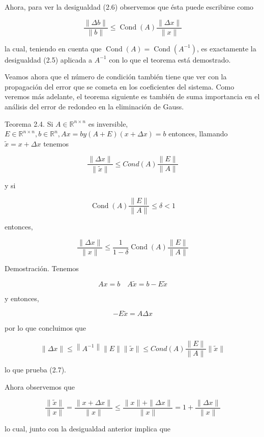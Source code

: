 \documentclass[10pt]{book}
\begin{document}
Ahora, para ver la desigualdad (2.6) observemos que ésta puede escribirse como

$$
\frac{\|\Delta b\|}{\|b\|} \leq \operatorname{Cond}(A) \frac{\|\Delta x\|}{\|x\|}
$$

la cual, teniendo en cuenta que $\operatorname{Cond}(A)=\operatorname{Cond}\left(A^{-1}\right)$, es exactamente la desigualdad (2.5) aplicada a $A^{-1}$ con lo que el teorema está demostrado.

Veamos ahora que el número de condición también tiene que ver con la propagación del error que se cometa en los coeficientes del sistema. Como veremos más adelante, el teorema siguiente es también de suma importancia en el análisis del error de redondeo en la eliminación de Gauss.

Teorema 2.4. Si $A \in \mathbb{R}^{n \times n}$ es inversible, $E \in \mathbb{R}^{n \times n}, b \in \mathbb{R}^{n}, A x=b y(A+E)(x+\Delta x)=b$ entonces, llamando $\tilde{x}=x+\Delta x$ tenemos


\begin{equation*}
\frac{\|\Delta x\|}{\|\tilde{x}\|} \leq C o n d(A) \frac{\|E\|}{\|A\|} \tag{2.7}
\end{equation*}


y si

$$
\operatorname{Cond}(A) \frac{\|E\|}{\|A\|} \leq \delta<1
$$

entonces,


\begin{equation*}
\frac{\|\Delta x\|}{\|x\|} \leq \frac{1}{1-\delta} \operatorname{Cond}(A) \frac{\|E\|}{\|A\|} \tag{2.8}
\end{equation*}


Demostración. Tenemos

$$
A x=b \quad A \tilde{x}=b-E \tilde{x}
$$

y entonces,

$$
-E \tilde{x}=A \Delta x
$$

por lo que concluimos que

$$
\|\Delta x\| \leq\left\|A^{-1}\right\|\|E\|\|\tilde{x}\| \leq C o n d(A) \frac{\|E\|}{\|A\|}\|\tilde{x}\|
$$

lo que prueba (2.7).

Ahora observemos que

$$
\frac{\|\tilde{x}\|}{\|x\|}=\frac{\|x+\Delta x\|}{\|x\|} \leq \frac{\|x\|+\|\Delta x\|}{\|x\|}=1+\frac{\|\Delta x\|}{\|x\|}
$$

lo cual, junto con la desigualdad anterior implica que
\end{document}
